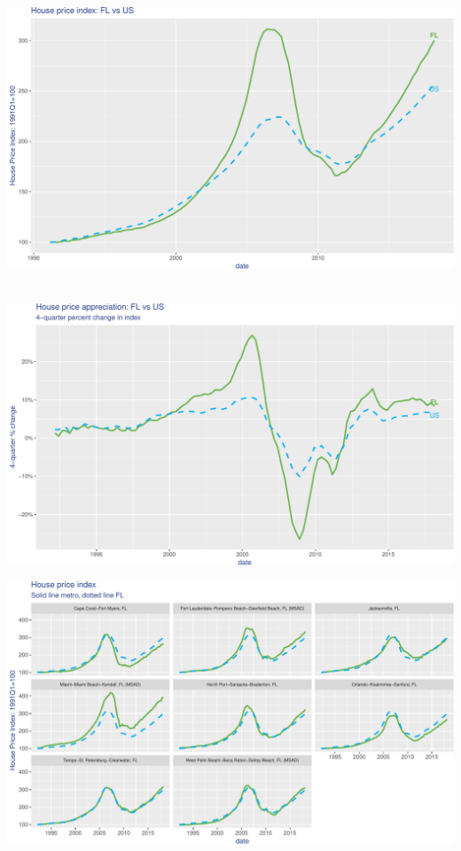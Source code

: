 \documentclass[]{article}
\begin{document}
\includegraphics{Florida_pricing_files/figure-latex/query_securitization_1-1.pdf}

~ \includegraphics{Florida_pricing_files/figure-latex/loanlevel-1.pdf}
\newpage
\thispagestyle{contentpage}
\fontsize{8pt}{12pt}\selectfont{}

\includegraphics{Florida_pricing_files/figure-latex/AccoutLevel-1.pdf}
\end{document}
